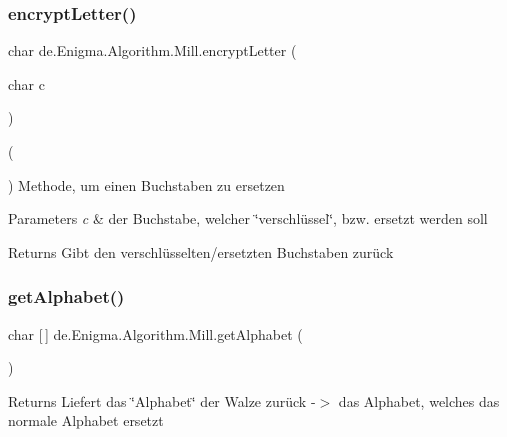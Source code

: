 \subsubsection{\texorpdfstring{encrypt\+Letter()}{encryptLetter()}}
{\footnotesize\ttfamily char de.\+Enigma.\+Algorithm.\+Mill.\+encrypt\+Letter (\begin{DoxyParamCaption}\item[{char}]{c }\end{DoxyParamCaption})}

(

) Methode, um einen Buchstaben zu ersetzen 
\begin{DoxyParams}{Parameters}
{\em c} & der Buchstabe, welcher \char`\"{}verschlüssel\char`\"{}, bzw. ersetzt werden soll \\
\hline
\end{DoxyParams}
\begin{DoxyReturn}{Returns}
Gibt den verschlüsselten/ersetzten Buchstaben zurück 
\end{DoxyReturn}
\mbox{\label{classde_1_1_enigma_1_1_algorithm_1_1_mill_a918c53ae722325d91c19cea90fdbedb1}} 
\subsubsection{\texorpdfstring{get\+Alphabet()}{getAlphabet()}}
{\footnotesize\ttfamily char \mbox{[}$\,$\mbox{]} de.\+Enigma.\+Algorithm.\+Mill.\+get\+Alphabet (\begin{DoxyParamCaption}{ }\end{DoxyParamCaption})}

\begin{DoxyReturn}{Returns}
Liefert das \char`\"{}\+Alphabet\char`\"{} der Walze zurück -\/$>$ das Alphabet, welches das normale Alphabet ersetzt 
\end{DoxyReturn}
\mbox{\label{classde_1_1_enigma_1_1_algorithm_1_1_mill_ae1c1cca1acd55ad6f5c86f811253bac8}} 
